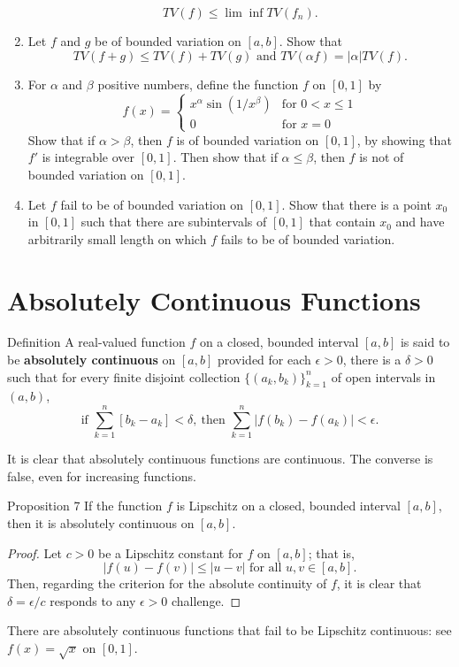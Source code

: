 \begin{enumerate}
    \[
        TV(f)\le\lim\inf TV(f_n).  
    \]
    \item Let $f$ and $g$ be of bounded variation on $[a,b]$. Show that 
    \[
        TV(f+g)\le TV(f)+TV(g)\text{ and }TV(\alpha f)=|\alpha|TV(f).
    \]
    \item For $\alpha$ and $\beta$ positive numbers, define the function $f$ on $[0,1]$ by
    \[
        f(x)=
        \begin{cases}
            x^\alpha\sin(1/x^\beta)&\text{for }0<x\le1\\
            0&\text{for }x=0
        \end{cases}    
    \]
    Show that if $\alpha>\beta$, then $f$ is of bounded variation on $[0,1]$, by showing that $f'$ is integrable over $[0,1]$. Then show that if $\alpha\le\beta$, then $f$ is not of bounded variation on $[0,1]$.
    \item Let $f$ fail to be of bounded variation on $[0,1]$. Show that there is a point $x_0$ in $[0,1]$ such that there are subintervals of $[0,1]$ that contain $x_0$ and have arbitrarily small length on which $f$ fails to be of bounded variation.
\end{enumerate}

\section{Absolutely Continuous Functions}

\begin{namedthm*}{Definition}
    A real-valued function $f$ on a closed, bounded interval $[a,b]$ is said to be \textbf{absolutely continuous} on $[a,b]$ provided for each $\epsilon>0$, there is a $\delta>0$ such that for every finite disjoint collection $\{(a_k,b_k)\}_{k=1}^n$ of open intervals in $(a,b)$,
    \[
        \text{if }\sum_{k=1}^n[b_k-a_k]<\delta,\ \text{then }\sum_{k=1}^n|f(b_k)-f(a_k)|<\epsilon.
    \]
\end{namedthm*}
It is clear that absolutely continuous functions are continuous.
The converse is false, even for increasing functions.
\begin{namedthm*}{Proposition 7}
    If the function $f$ is Lipschitz on a closed, bounded interval $[a,b]$, then it is absolutely continuous on $[a,b]$.
\end{namedthm*}
\begin{proof}
    Let $c>0$ be a Lipschitz constant for $f$ on $[a,b]$; that is,
    \[
        |f(u)-f(v)|\le |u-v|\text{ for all }u,v\in[a,b].
    \]
    Then, regarding the criterion for the absolute continuity of $f$, it is clear that $\delta=\epsilon/c$ responds to any $\epsilon>0$ challenge.
\end{proof}
There are absolutely continuous functions that fail to be Lipschitz continuous: see $f(x)=\sqrt{x}$ on $[0,1]$.

